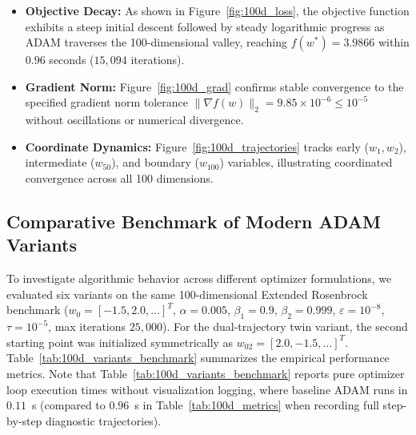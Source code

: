 \documentclass[11pt,a4paper]{article}
\newcommand{\added}[1]{#1}
\begin{document}
\begin{itemize}
    \item \textbf{Objective Decay:} As shown in Figure~\ref{fig:100d_loss}, the objective function exhibits a steep initial descent followed by steady logarithmic progress as ADAM traverses the 100-dimensional valley, reaching $f(w^*) = 3.9866$ within $0.96$ seconds ($15{,}094$ iterations).
    \item \textbf{Gradient Norm:} Figure~\ref{fig:100d_grad} confirms stable convergence to the specified gradient norm tolerance $\|\nabla f(w)\|_2 = 9.85 \times 10^{-6} \le 10^{-5}$ without oscillations or numerical divergence.
    \item \textbf{Coordinate Dynamics:} Figure~\ref{fig:100d_trajectories} tracks early ($w_1, w_2$), intermediate ($w_{50}$), and boundary ($w_{100}$) variables, illustrating coordinated convergence across all 100 dimensions.
\end{itemize}

\added{\subsection{Comparative Benchmark of Modern ADAM Variants}\label{sec:variants}}

\added{To investigate algorithmic behavior across different optimizer formulations, we evaluated six variants on the same 100-dimensional Extended Rosenbrock benchmark ($w_0 = [-1.5, 2.0, \dots]^T$, $\alpha = 0.005$, $\beta_1 = 0.9$, $\beta_2 = 0.999$, $\varepsilon = 10^{-8}$, $\tau = 10^{-5}$, max iterations $25{,}000$). For the dual-trajectory twin variant, the second starting point was initialized symmetrically as $w_{02} = [2.0, -1.5, \dots]^T$. Table~\ref{tab:100d_variants_benchmark} summarizes the empirical performance metrics. Note that Table~\ref{tab:100d_variants_benchmark} reports pure optimizer loop execution times without visualization logging, where baseline ADAM runs in $0.11$~s (compared to $0.96$~s in Table~\ref{tab:100d_metrics} when recording full step-by-step diagnostic trajectories).}
\end{document}
